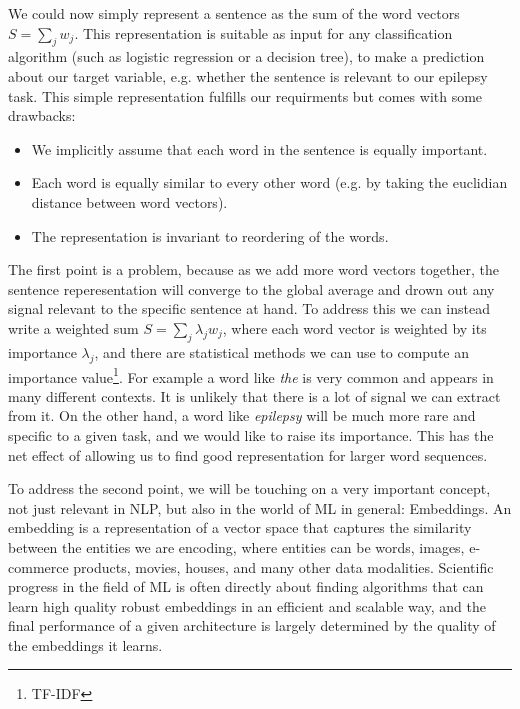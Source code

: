 We could now simply represent a sentence as the sum of the word vectors $S = \sum_j w_j$. This representation is suitable as input for any classification algorithm (such as logistic regression or a decision tree), to make a prediction about our target variable, e.g. whether the sentence is relevant to our epilepsy task.
This simple representation fulfills our requirments but comes with some drawbacks:
\begin{itemize}
    \item We implicitly assume that each word in the sentence is equally important.
    \item Each word is equally similar to every other word (e.g. by taking the euclidian distance between word vectors).
    \item The representation is invariant to reordering of the words.
\end{itemize}
The first point is a problem, because as we add more word vectors together, the sentence reperesentation will converge to the global average and drown out any signal relevant to the specific sentence at hand.
To address this we can instead write a weighted sum $S = \sum_j \lambda_j w_j$, where each word vector is weighted by its importance $\lambda_j$, and there are statistical methods we can use to compute an importance value\footnote{TF-IDF}.
For example a word like \textit{the} is very common and appears in many different contexts.
It is unlikely that there is a lot of signal we can extract from it.
On the other hand, a word like \textit{epilepsy} will be much more rare and specific to a given task, and we would like to raise its importance.
This has the net effect of allowing us to find good representation for larger word sequences.

To address the second point, we will be touching on a very important concept, not just relevant in NLP, but also in the world of ML in general: Embeddings.
An embedding is a representation of a vector space that captures the similarity between the entities we are encoding, where entities can be words, images, e-commerce products, movies, houses, and many other data modalities.
Scientific progress in the field of ML is often directly about finding algorithms that can learn high quality robust embeddings in an efficient and scalable way, and the final performance of a given architecture is largely determined by the quality of the embeddings it learns.

